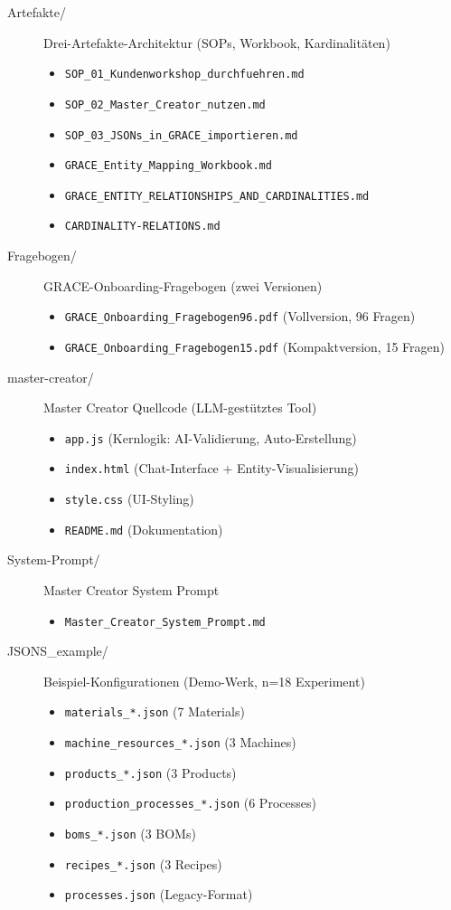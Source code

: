 \begin{description}
\item[Artefakte/] Drei-Artefakte-Architektur (SOPs, Workbook, Kardinalitäten)
\begin{itemize}
    \item \texttt{SOP\_01\_Kundenworkshop\_durchfuehren.md}
    \item \texttt{SOP\_02\_Master\_Creator\_nutzen.md}
    \item \texttt{SOP\_03\_JSONs\_in\_GRACE\_importieren.md}
    \item \texttt{GRACE\_Entity\_Mapping\_Workbook.md}
    \item \texttt{GRACE\_ENTITY\_RELATIONSHIPS\_AND\_CARDINALITIES.md}
    \item \texttt{CARDINALITY-RELATIONS.md}
\end{itemize}

\item[Fragebogen/] GRACE-Onboarding-Fragebogen (zwei Versionen)
\begin{itemize}
    \item \texttt{GRACE\_Onboarding\_Fragebogen96.pdf} (Vollversion, 96 Fragen)
    \item \texttt{GRACE\_Onboarding\_Fragebogen15.pdf} (Kompaktversion, 15 Fragen)
\end{itemize}

\item[master-creator/] Master Creator Quellcode (LLM-gestütztes Tool)
\begin{itemize}
    \item \texttt{app.js} (Kernlogik: AI-Validierung, Auto-Erstellung)
    \item \texttt{index.html} (Chat-Interface + Entity-Visualisierung)
    \item \texttt{style.css} (UI-Styling)
    \item \texttt{README.md} (Dokumentation)
\end{itemize}

\item[System-Prompt/] Master Creator System Prompt
\begin{itemize}
    \item \texttt{Master\_Creator\_System\_Prompt.md}
\end{itemize}

\item[JSONS\_example/] Beispiel-Konfigurationen (Demo-Werk, n=18 Experiment)
\begin{itemize}
    \item \texttt{materials\_*.json} (7 Materials)
    \item \texttt{machine\_resources\_*.json} (3 Machines)
    \item \texttt{products\_*.json} (3 Products)
    \item \texttt{production\_processes\_*.json} (6 Processes)
    \item \texttt{boms\_*.json} (3 BOMs)
    \item \texttt{recipes\_*.json} (3 Recipes)
    \item \texttt{processes.json} (Legacy-Format)
\end{itemize}


\end{description}
